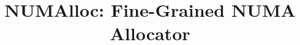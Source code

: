 \documentclass[sigplan,review,anonymous]{acmart}
\title{NUMAlloc: Fine-Grained NUMA  Allocator}
\begin{document}
\maketitle
\thispagestyle{plain}
\pagestyle{plain}

\begin{abstract}

\end{abstract}











\end{document}
